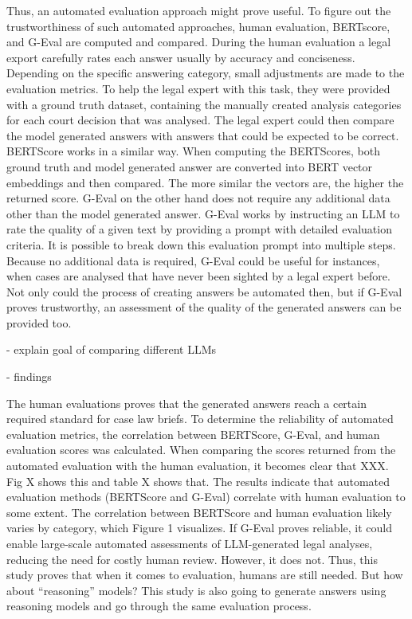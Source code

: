 \documentclass[a4paper,12pt]{article}
\begin{document}
Thus, an automated evaluation approach might prove useful. To figure out the trustworthiness of such automated approaches, human evaluation, BERTscore, and G-Eval are computed and compared. During the human evaluation a legal export carefully rates each answer usually by accuracy and conciseness. Depending on the specific answering category, small adjustments are made to the evaluation metrics. To help the legal expert with this task, they were provided with a ground truth dataset, containing the manually created analysis categories for each court decision that was analysed. The legal expert could then compare the model generated answers with answers that could be expected to be correct. BERTScore works in a similar way. When computing the BERTScores, both ground truth and model generated answer are converted into BERT vector embeddings and then compared. The more similar the vectors are, the higher the returned score. G-Eval on the other hand does not require any additional data other than the model generated answer. G-Eval works by instructing an LLM to rate the quality of a given text by providing a prompt with detailed evaluation criteria. It is possible to break down this evaluation prompt into multiple steps. Because no additional data is required, G-Eval could be useful for instances, when cases are analysed that have never been sighted by a legal expert before. Not only could the process of creating answers be automated then, but if G-Eval proves trustworthy, an assessment of the quality of the generated answers can be provided too.

- explain goal of comparing different LLMs

- findings

The human evaluations proves that the generated answers reach a certain required standard for case law briefs. To determine the reliability of automated evaluation metrics, the correlation between BERTScore, G-Eval, and human evaluation scores was calculated. When comparing the scores returned from the automated evaluation with the human evaluation, it becomes clear that XXX. Fig X shows this and table X shows that.
The results indicate that automated evaluation methods (BERTScore and G-Eval) correlate with human evaluation to some extent.
The correlation between BERTScore and human evaluation likely varies by category, which Figure 1 visualizes.
If G-Eval proves reliable, it could enable large-scale automated assessments of LLM-generated legal analyses, reducing the need for costly human review. However, it does not. Thus, this study proves that when it comes to evaluation, humans are still needed. But how about ``reasoning'' models? This study is also going to generate answers using reasoning models and go through the same evaluation process.
\end{document}
